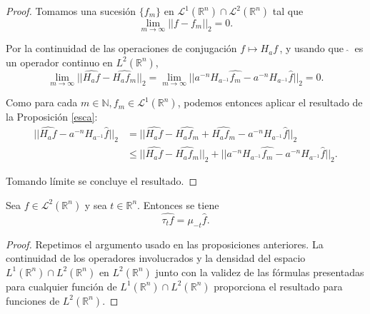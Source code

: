 \begin{proof}
 \noindent Tomamos una sucesión $\{f_m\}$ en  $\mathscr{L}^1(\mathbb{R}^n)\cap\mathscr{L}^2(\mathbb{R}^n)$ tal que
\begin{equation}
    \lim_{m  \rightarrow \infty}||f-f_m||_2 =0.
\end{equation}


\noindent Por la continuidad de las operaciones de conjugación $ f \mapsto H_af\,$, y usando que $\ \widehat{}\ $ es un operador continuo en $L^2(\mathbb{R}^n)$,
\begin{equation}
    \lim_{m \rightarrow \infty}||\widehat{H_af}- \widehat{H_af_m}||_2=  \lim_{m \rightarrow \infty}||a^{-n}H_{a^{-1}}\widehat{f_m} -a^{-n}H_{a^{-1}}\widehat{f}||_2 =0.
\end{equation}

\noindent Como para cada $m \in \mathbb{N}, f_m \in \mathscr{L}^1(\mathbb{R}^n)$, podemos entonces aplicar el resultado de la Proposición \ref{esca}:
\begin{align}
||\widehat{H_af}-a^{-n}H_{a^{-1}}\widehat{f}||_2 
&= ||\widehat{H_af}- \widehat{H_af_m}+\widehat{H_af_m} -a^{-n}H_{a^{-1}}\widehat{f}||_2 \\
&\leq ||\widehat{H_af}- \widehat{H_af_m}||_2+||a^{-n}H_{a^{-1}}\widehat{f_m} -a^{-n}H_{a^{-1}}\widehat{f}||_2.
\end{align}


\noindent Tomando límite se  concluye el resultado.
\end{proof}






\begin{proposicion}\label{prop:tras}
    Sea $f \in \mathscr{L}^2(\mathbb{R}^n)$ y sea $t \in \mathbb{R}^n$. Entonces se tiene
    \begin{equation}
        \widehat{\tau_tf} =  \mu_{-t}\widehat{f}.
    \end{equation}
    
\end{proposicion}

\begin{proof}
Repetimos el argumento usado en las proposiciones anteriores. La continuidad de los operadores involucrados y la densidad del espacio $L^1(\mathbb{R}^n) \cap L^2(\mathbb{R}^n)$ en $L^2(\mathbb{R}^n)$ junto con la validez de las fórmulas presentadas para cualquier función de $L^1(\mathbb{R}^n) \cap L^2(\mathbb{R}^n)$ proporciona el resultado para funciones de  $L^2(\mathbb{R}^n)$.
\end{proof}


